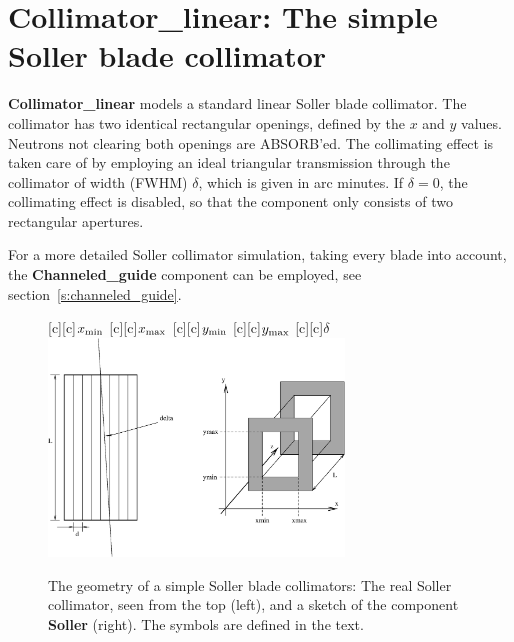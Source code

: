 \section{Collimator\_linear: The simple Soller blade collimator}
\label{collimator-linear}


{\bf Collimator\_linear} models a standard linear Soller blade collimator.
The collimator has two identical rectangular openings,
defined by the $x$ and $y$ values. Neutrons not clearing both
openings are ABSORB'ed.
The collimating effect is taken care of by employing an ideal
triangular transmission through the collimator of width (FWHM) $\delta$, 
which is given in arc minutes. 
If $\delta=0$, the collimating effect is disabled,
so that the component only consists of two rectangular apertures.

For a more detailed Soller collimator simulation,
taking every blade into account, the {\bf Channeled\_guide}
component can be employed, see section~\ref{s:channeled_guide}.

\begin{figure}[h!]
  \begin{center}
    [c][c]{$x_{\rm min}$}
    [c][c]{$x_{\rm max}$}
    [c][c]{$y_{\rm min}$}
    [c][c]{$y_{\rm max}$}
    [c][c]{$\delta$}
    \includegraphics[width=0.7\textwidth]{figures/collimator.eps}
  \end{center}
\caption{The geometry of a simple Soller blade collimators:
The real Soller collimator, seen from the top (left),
and a sketch of the component {\bf Soller} (right).
The symbols are defined in the text.}
\label{f:collimator}
\end{figure}

